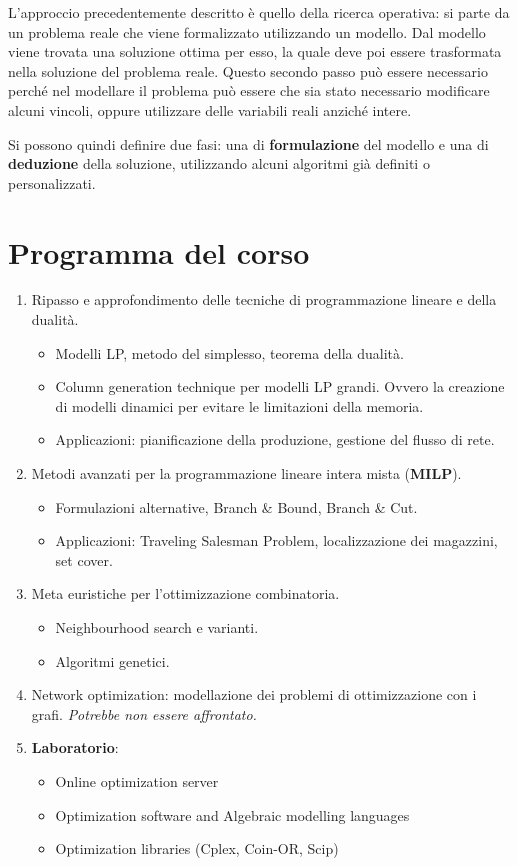 L'approccio precedentemente descritto è quello della ricerca operativa: si parte da un problema reale che viene formalizzato utilizzando un modello. Dal modello viene trovata una soluzione ottima per esso, la quale deve poi essere trasformata nella soluzione del problema reale.
Questo secondo passo può essere necessario perché nel modellare il problema può essere che sia stato necessario modificare alcuni vincoli, oppure utilizzare delle variabili reali anziché intere.

Si possono quindi definire due fasi: una di \textbf{formulazione} del modello e una di \textbf{deduzione} della soluzione, utilizzando alcuni algoritmi già definiti o personalizzati.

\section{Programma del corso}

\begin{enumerate}
	\item Ripasso e approfondimento delle tecniche di programmazione lineare e della dualità.
		\begin{itemize}
			\item Modelli LP, metodo del simplesso, teorema della dualità.
			\item Column generation technique per modelli LP grandi. Ovvero la creazione di modelli dinamici per evitare le limitazioni della memoria.
			\item Applicazioni: pianificazione della produzione, gestione del flusso di rete.
		\end{itemize}
	\item Metodi avanzati per la programmazione lineare intera mista (\textbf{MILP}).
		\begin{itemize}
			\item Formulazioni alternative, Branch \& Bound, Branch \& Cut.
			\item Applicazioni: Traveling Salesman Problem, localizzazione dei magazzini, set cover.
		\end{itemize}
	\item Meta euristiche per l'ottimizzazione combinatoria.
		\begin{itemize}
			\item Neighbourhood search e varianti.
			\item Algoritmi genetici.
		\end{itemize}
	\item Network optimization: modellazione dei problemi di ottimizzazione con i grafi. \textit{Potrebbe non essere affrontato.}
	\item \textbf{Laboratorio}:
		\begin{itemize}
			\item Online optimization server
			\item Optimization software and Algebraic modelling languages
			\item Optimization libraries (Cplex, Coin-OR, Scip)
		\end{itemize}
\end{enumerate}


